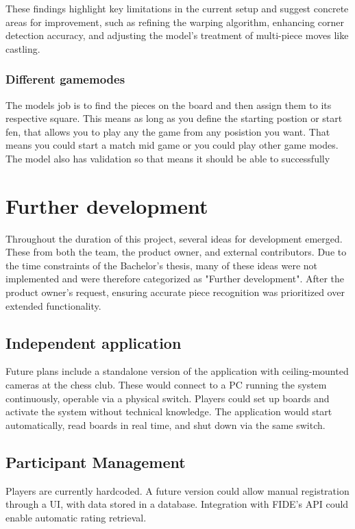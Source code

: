 These findings highlight key limitations in the current setup and suggest concrete areas for improvement, such as refining the warping algorithm, enhancing corner detection accuracy, and adjusting the model’s treatment of multi-piece moves like castling.


\subsubsection{Different gamemodes}

The models job is to find the pieces on the board and then assign them to its respective square. This means as long as you define the starting postion or start fen, that allows you to play any the game from any posistion you want. That means you could start a match mid game or you could play other game modes. The model also has validation so that means it should be able to successfully




\section{Further development}
Throughout the duration of this project, several ideas for development emerged. These from both the team, the product owner, and external contributors. Due to the time constraints of the Bachelor’s thesis, many of these ideas were not implemented and were therefore categorized as "Further development". After the product owner's request, ensuring accurate piece recognition was prioritized over extended functionality.

\subsection{Independent application}
Future plans include a standalone version of the application with ceiling-mounted cameras at the chess club. These would connect to a PC running the system continuously, operable via a physical switch. Players could set up boards and activate the system without technical knowledge. The application would start automatically, read boards in real time, and shut down via the same switch.

\subsection{Participant Management}
Players are currently hardcoded. A future version could allow manual registration through a UI, with data stored in a database. Integration with FIDE’s API could enable automatic rating retrieval.

